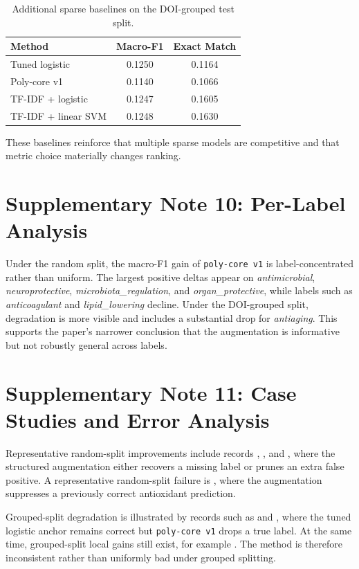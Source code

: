 \documentclass{article}
\begin{document}
\begin{table}[h]
\centering
\caption{Additional sparse baselines on the DOI-grouped test split.}
\begin{tabular}{lcc}
\toprule
Method & Macro-F1 & Exact Match \\
\midrule
Tuned logistic & 0.1250 & 0.1164 \\
Poly-core v1 & 0.1140 & 0.1066 \\
TF-IDF + logistic & 0.1247 & 0.1605 \\
TF-IDF + linear SVM & 0.1248 & 0.1630 \\
\bottomrule
\end{tabular}
\end{table}

These baselines reinforce that multiple sparse models are competitive and that metric choice materially changes ranking.

\section{Supplementary Note 10: Per-Label Analysis}

Under the random split, the macro-F1 gain of \texttt{poly-core v1} is label-concentrated rather than uniform. The largest positive deltas appear on \textit{antimicrobial}, \textit{neuroprotective}, \textit{microbiota\_regulation}, and \textit{organ\_protective}, while labels such as \textit{anticoagulant} and \textit{lipid\_lowering} decline. Under the DOI-grouped split, degradation is more visible and includes a substantial drop for \textit{antiaging}. This supports the paper's narrower conclusion that the augmentation is informative but not robustly general across labels.

\section{Supplementary Note 11: Case Studies and Error Analysis}

Representative random-split improvements include records , , and , where the structured augmentation either recovers a missing label or prunes an extra false positive. A representative random-split failure is , where the augmentation suppresses a previously correct antioxidant prediction.

Grouped-split degradation is illustrated by records such as  and , where the tuned logistic anchor remains correct but \texttt{poly-core v1} drops a true label. At the same time, grouped-split local gains still exist, for example . The method is therefore inconsistent rather than uniformly bad under grouped splitting.
\end{document}
